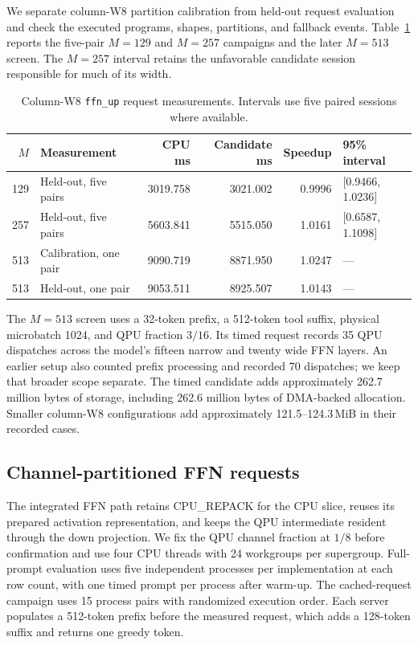 \documentclass[sigplan,screen,review]{acmart}
\begin{document}
We separate column-W8 partition calibration from held-out request evaluation and check the executed programs, shapes, partitions, and fallback events. Table~\ref{tab:column-w8-requests} reports the five-pair \(M=129\) and \(M=257\) campaigns and the later \(M=513\) screen. The \(M=257\) interval retains the unfavorable candidate session responsible for much of its width.

\begin{table}[t]
\centering
\caption{Column-W8 \texttt{ffn\_up} request measurements. Intervals use five paired sessions where available.}
\label{tab:column-w8-requests}
\small
\begin{tabular}{@{}rlrrrl@{}}
\toprule
$M$ & Measurement & CPU ms & Candidate ms & Speedup & 95\% interval \\
\midrule
129 & Held-out, five pairs & 3019.758 & 3021.002 & 0.9996 & [0.9466, 1.0236] \\
257 & Held-out, five pairs & 5603.841 & 5515.050 & 1.0161 & [0.6587, 1.1098] \\
513 & Calibration, one pair & 9090.719 & 8871.950 & 1.0247 & --- \\
513 & Held-out, one pair & 9053.511 & 8925.507 & 1.0143 & --- \\
\bottomrule
\end{tabular}
\end{table}

The \(M=513\) screen uses a 32-token prefix, a 512-token tool suffix, physical microbatch 1024, and QPU fraction \(3/16\). Its timed request records 35 QPU dispatches across the model's fifteen narrow and twenty wide FFN layers. An earlier setup also counted prefix processing and recorded 70 dispatches; we keep that broader scope separate. The timed candidate adds approximately 262.7 million bytes of storage, including 262.6 million bytes of DMA-backed allocation. Smaller column-W8 configurations add approximately 121.5--124.3\,MiB in their recorded cases.

\subsection{Channel-partitioned FFN requests}

The integrated FFN path retains CPU\_REPACK for the CPU slice, reuses its prepared activation representation, and keeps the QPU intermediate resident through the down projection. We fix the QPU channel fraction at \(1/8\) before confirmation and use four CPU threads with 24 workgroups per supergroup. Full-prompt evaluation uses five independent processes per implementation at each row count, with one timed prompt per process after warm-up. The cached-request campaign uses 15 process pairs with randomized execution order. Each server populates a 512-token prefix before the measured request, which adds a 128-token suffix and returns one greedy token.
\end{document}
